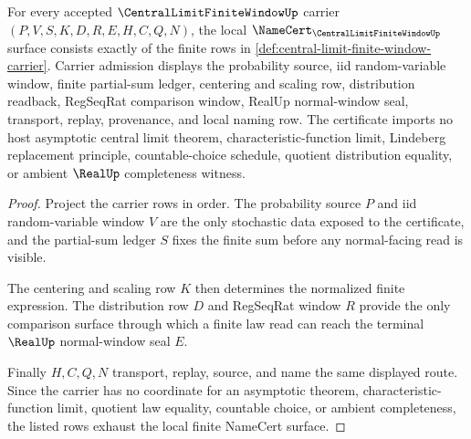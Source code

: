 \begin{theorem}\label{thm:central-limit-finite-window-namecert-obligations}
For every accepted $\CentralLimitFiniteWindowUp$ carrier $(P,V,S,K,D,R,E,H,C,Q,N)$, the local $\NameCert_{\CentralLimitFiniteWindowUp}$ surface consists exactly of the finite rows in \autoref{def:central-limit-finite-window-carrier}. Carrier admission displays the probability source, iid random-variable window, finite partial-sum ledger, centering and scaling row, distribution readback, RegSeqRat comparison window, RealUp normal-window seal, transport, replay, provenance, and local naming row. The certificate imports no host asymptotic central limit theorem, characteristic-function limit, Lindeberg replacement principle, countable-choice schedule, quotient distribution equality, or ambient $\RealUp$ completeness witness.
\end{theorem}
\begin{proof}
Project the carrier rows in order. The probability source $P$ and iid random-variable window $V$ are the only stochastic data exposed to the certificate, and the partial-sum ledger $S$ fixes the finite sum before any normal-facing read is visible.

The centering and scaling row $K$ then determines the normalized finite expression. The distribution row $D$ and RegSeqRat window $R$ provide the only comparison surface through which a finite law read can reach the terminal $\RealUp$ normal-window seal $E$.

Finally $H,C,Q,N$ transport, replay, source, and name the same displayed route. Since the carrier has no coordinate for an asymptotic theorem, characteristic-function limit, quotient law equality, countable choice, or ambient completeness, the listed rows exhaust the local finite NameCert surface.
\end{proof}

